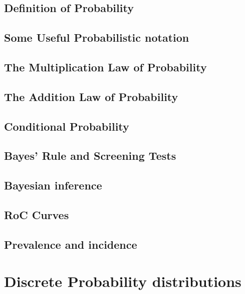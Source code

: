 \documentclass[12pt,]{article}
\theoremstyle{definition}
\theoremstyle{definition}
\theoremstyle{definition}
\theoremstyle{remark}
\begin{document}
\subsection{Definition of Probability}\label{definition-of-probability}

\subsection{Some Useful Probabilistic
notation}\label{some-useful-probabilistic-notation}

\subsection{The Multiplication Law of
Probability}\label{the-multiplication-law-of-probability}

\subsection{The Addition Law of
Probability}\label{the-addition-law-of-probability}

\subsection{Conditional Probability}\label{conditional-probability}

\subsection{Bayes' Rule and Screening
Tests}\label{bayes-rule-and-screening-tests}

\subsection{Bayesian inference}\label{bayesian-inference}

\subsection{RoC Curves}\label{roc-curves}

\subsection{Prevalence and incidence}\label{prevalence-and-incidence}

\section{Discrete Probability
distributions}\label{discrete-probability-distributions}
\end{document}
